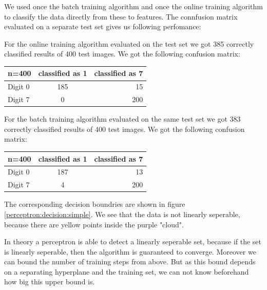 We used once the batch training algorithm and once the online training algorithm to classify the data directly from these to features. The connfusion matrix evaluated on a separate test set gives us following perfomance:

For the online training algorithm evaluated on the test set we got 385 correctly classified results of 400 test images. We got the following confusion matrix:

\begin{tabular}{ l | c | r }
\centering
  n=400 & classified as 1 & classified as 7 \\ \hline
  Digit 0 & 185 & 15 \\
  Digit 7 & 0 & 200 \\
\end{tabular}

For the batch training algorithm evaluated on the same test set we got 383 correctly classified results of 400 test images. We got the following confusion matrix:

\begin{tabular}{ l | c | r }
\centering
  n=400 & classified as 1 & classified as 7 \\ \hline
  Digit 0 & 187 & 13 \\
  Digit 7 & 4 & 200 \\
\end{tabular}

The corresponding decision boundries are shown in figure \ref{perceptron:decision:simple}. We see that the data is not linearly seperable, because there are yellow points inside the purple "cloud".

 In theory a perceptron is able to detect a linearly seperable set, because if the set is linearly seperable, then the algorithm is guaranteed to converge. Moreover we can bound the number of training steps from above. But as this bound depends on a separating hyperplane and the training set, we can not know beforehand how big this upper bound is.

